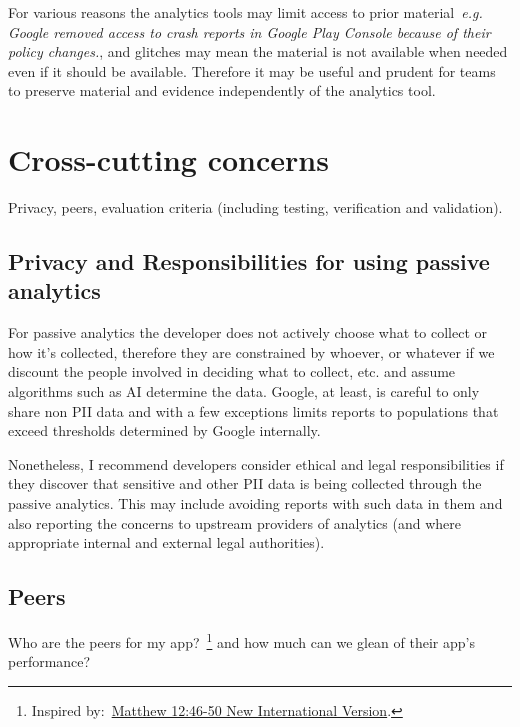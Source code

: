 For various reasons the analytics tools may limit access to prior material~\emph{e.g. Google removed access to crash reports in Google Play Console because of their policy changes.}, and glitches may mean the material is not available when needed even if it should be available. Therefore it may be useful and prudent for teams to preserve material and evidence independently of the analytics tool. 


\section{Cross-cutting concerns}
Privacy, peers, evaluation criteria (including testing, verification and validation).

\subsection{Privacy and Responsibilities for using passive analytics}
For passive analytics the developer does not actively choose what to collect or how it's collected, therefore they are constrained by whoever, or whatever if we discount the people involved in deciding what to collect, etc. and assume algorithms such as AI determine the data. Google, at least, is careful to only share non PII %
data and with a few exceptions limits reports to populations that exceed thresholds determined by Google internally. %

Nonetheless, I recommend developers consider ethical and legal responsibilities if they discover that sensitive and other PII data is being collected through the passive analytics. This may include avoiding reports with such data in them and also reporting the concerns to upstream providers of analytics (and where appropriate internal and external legal authorities).

\subsection{Peers}
Who are the peers for my app?~\footnote{Inspired by:~\href{https://www.biblegateway.com/passage/?search=Matthew\%2012:46-50&version=NIV}{Matthew 12:46-50 New International Version}.} and how much can we glean of their app's performance?

